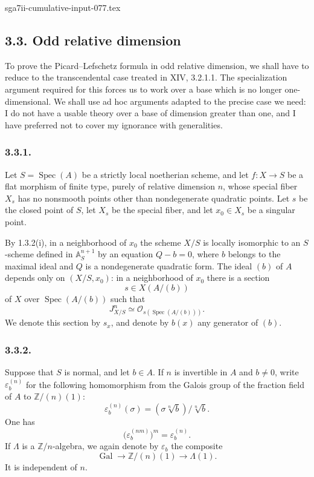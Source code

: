 \begin{filecontents*}{sga7ii-cumulative-input-077.tex}
\subsection*{3.3. Odd relative dimension}

To prove the Picard--Lefschetz formula in odd relative dimension, we
shall have to reduce to the transcendental case treated in XIV,
3.2.1.1.  The specialization argument required for this forces us to
work over a base which is no longer one-dimensional.  We shall use
ad hoc arguments adapted to the precise case we need: I do not have
a usable theory over a base of dimension greater than one, and I have
preferred not to cover my ignorance with generalities.

\subsubsection*{3.3.1.}
Let $S=\operatorname{Spec}(A)$ be a strictly local noetherian scheme,
and let $f:X\to S$ be a flat morphism of finite type, purely of
relative dimension $n$, whose special fiber $X_s$ has no nonsmooth
points other than nondegenerate quadratic points.  Let $s$ be the
closed point of $S$, let $X_s$ be the special fiber, and let
$x_0\in X_s$ be a singular point.

By 1.3.2(i), in a neighborhood of $x_0$ the scheme $X/S$ is locally
isomorphic to an $S$-scheme defined in $\mathbb A^{n+1}_S$ by an
equation $Q-b=0$, where $b$ belongs to the maximal ideal and $Q$ is a
nondegenerate quadratic form.  The ideal $(b)$ of $A$ depends only
on $(X/S,x_0)$: in a neighborhood of $x_0$ there is a section
\[
s\in X(A/(b))
\]
of $X$ over $\operatorname{Spec}(A/(b))$ such that
\[
J^n_{X/S}\simeq
\mathcal O_{s(\operatorname{Spec}(A/(b)))}.
\]
We denote this section by $s_x$, and denote by $b(x)$ any generator
of $(b)$.

\subsubsection*{3.3.2.}
Suppose that $S$ is normal, and let $b\in A$.  If $n$ is invertible
in $A$ and $b\ne0$, write $\varepsilon_b^{(n)}$ for the following
homomorphism from the Galois group of the fraction field of $A$ to
$\mathbb Z/(n)(1)$:
\[
\varepsilon_b^{(n)}(\sigma)
= (\sigma\sqrt[n]{b})/\sqrt[n]{b}.
\]
One has
\[
\bigl(\varepsilon_b^{(nm)}\bigr)^m=\varepsilon_b^{(n)}.
\]
If $\Lambda$ is a $\mathbb Z/n$-algebra, we again denote by
$\varepsilon_b$ the composite
\[
\operatorname{Gal}\longrightarrow\mathbb Z/(n)(1)
\longrightarrow\Lambda(1).
\]
It is independent of $n$.


\end{filecontents*}
